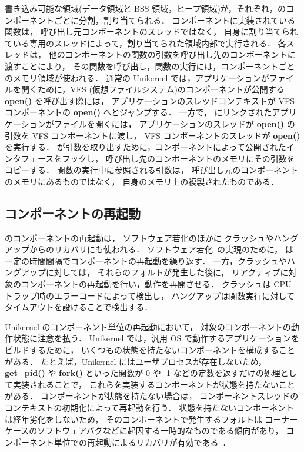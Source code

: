 書き込み可能な領域(データ領域と BSS 領域，ヒープ領域)が，それぞれ，\sysname のコンポーネントごとに分割，割り当てられる．
コンポーネントに実装されている関数は，
呼び出し元コンポーネントのスレッドではなく，
自身に割り当てられている専用のスレッドによって，割り当てられた領域内部で実行される．
各スレッドは，
他のコンポーネントの関数の引数を呼び出し先のコンポーネントに渡すことにより，
その関数を呼び出し，関数の実行には，コンポーネントごとのメモリ領域が使われる．
通常の Unikernel では，アプリケーションがファイルを開くために，VFS (仮想ファイルシステム)のコンポーネントが公開する \textbf{open()} を呼び出す際には，
アプリケーションのスレッドコンテキストが VFS コンポーネントの \textbf{open()} へとジャンプする．
一方で， \sysname にリンクされたアプリケーションがファイルを開くには，
アプリケーションのスレッドが \textbf{open()} の引数を VFS コンポーネントに渡し，
VFS コンポーネントのスレッドが \textbf{open()} を実行する．
\sysname が引数を取り出すために，コンポーネントによって公開されたインタフェースをフックし，
呼び出し先のコンポーネントのメモリにその引数をコピーする．
関数の実行中に参照される引数は，
呼び出し元のコンポーネントのメモリにあるものではなく，
自身のメモリ上の複製されたものである．


\subsection{コンポーネントの再起動}


\sysname のコンポーネントの再起動は，
ソフトウェア若化のほかに
クラッシュやハングアップからのリカバリにも使われる．
ソフトウェア若化~\cite{HuangEtAl-rejuvenation,CotroneoEtAl-rejuvenation-survey,CotroneoEtAl-Surv14}の実現のために，
\sysname は一定の時間間隔でコンポーネントの再起動を繰り返す．
一方，クラッシュやハングアップに対しては，
それらのフォルトが発生した後に，
リアクティブに対象のコンポーネントの再起動を行い，動作を再開させる．
クラッシュは CPU トラップ時のエラーコードによって検出し，
ハングアップは関数実行に対してタイムアウトを設けることで検出する．


Unikernel のコンポーネント単位の再起動において，
対象のコンポーネントの動作状態に注意を払う．
Unikernel では，汎用 OS で動作するアプリケーションをビルドするために，
いくつもの状態を持たないコンポーネントを構成することがある．
たとえば，Unikernel にはユーザプロセスが存在しないため，
\textbf{get\_pid()} や \textbf{fork()}
といった関数が 0 や -1 などの定数を返すだけの処理として実装されることで，
これらを実装するコンポーネントが状態を持たないことがある．
コンポーネントが状態を持たない場合は，
コンポーネントスレッドのコンテキストの初期化によって再起動を行う．
状態を持たないコンポーネントは経年劣化をしないため，
そのコンポーネントで発生するフォルトは
コーナーケースのソフトウェアバグなどに起因する一時的なものである傾向があり，
コンポーネント単位での再起動によるリカバリが有効である~\cite{BhatEtAl-OSIRIS, LiEtAl-TxIPC}．

